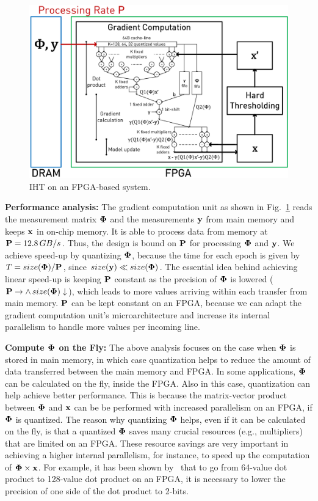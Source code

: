 \documentclass{article}
\begin{document}
{\begin{figure}[t!]
\centering
\includegraphics[width=1.4\columnwidth, angle=0]{figs/niht_fpga.eps}
\caption{IHT on an FPGA-based system.}
\label{fig:fpga}
\end{figure}


{\bf Performance analysis:} The gradient computation unit as shown in Fig.~\ref{fig:fpga} reads the measurement matrix ${\bf \Phi}$ and the measurements ${\bf y}$ from main memory and keeps ${\bf x}$ in on-chip memory. It is able to process data from memory at ${\bf P}=12.8\,GB/s$. Thus, the design is bound on ${\bf P}$ for processing ${\bf \Phi}$ and ${\bf y}$. We achieve speed-up by quantizing ${\bf \Phi}$, because the time for each epoch is given by
$T = size({\bf \Phi})/{\bf P}$, since $size({\bf y}) \ll size({\bf \Phi})$. The essential idea behind achieving linear speed-up is keeping ${\bf P}$ constant as the precision of ${\bf \Phi}$ is lowered (${\bf P}\to \land \, size({\bf \Phi})\downarrow$), which leads to more values arriving within each transfer from main memory. ${\bf P}$ can be kept constant on an FPGA, because we can adapt the gradient computation unit's microarchitecture and increase its internal parallelism to handle more values per incoming line. 


{\bf Compute ${\bf \Phi}$ on the Fly:} The above analysis focuses on the case when ${\bf \Phi}$ 
is stored in main memory, in which case quantization helps to reduce the amount of 
data transferred between the main memory and FPGA. In some applications, ${\bf \Phi}$
can be calculated on the fly, inside the FPGA. Also in this case, quantization can help 
achieve better performance.
This is because the matrix-vector product between ${\bf \Phi}$ and ${\bf x}$ can be 
be performed with increased parallelism on an FPGA, if ${\bf \Phi}$ is quantized.
The reason why quantizing ${\bf \Phi}$ helps, even if it can be calculated on the fly, is
that a quantized ${\bf \Phi}$ saves many crucial resources (e.g., multipliers) that
are limited on an FPGA. These resource savings are very important in achieving a higher 
internal parallelism, for instance, to speed up the computation of ${\bf \Phi}\times{\bf x}$. 
For example, it has been shown by~\cite{kara2017fpga} that to go from 64-value dot product to 128-value
dot product on an FPGA, it is necessary to lower the precision of one side of the dot product to 2-bits.

}
\end{document}
